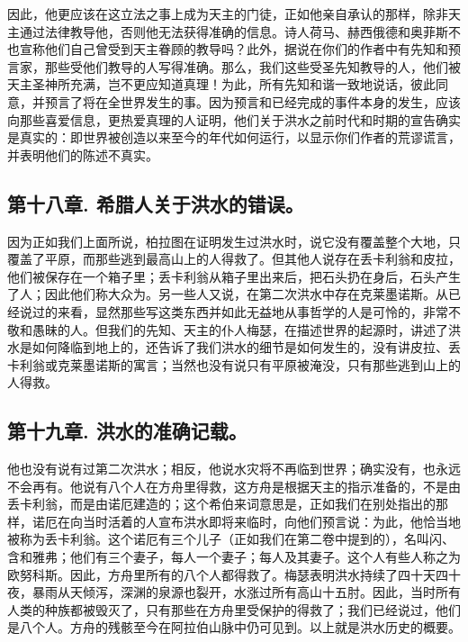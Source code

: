 因此，他更应该在这立法之事上成为天主的门徒，正如他亲自承认的那样，除非天主通过法律教导他，否则他无法获得准确的信息。诗人荷马、赫西俄德和奥菲斯不也宣称他们自己曾受到天主眷顾的教导吗？此外，据说在你们的作者中有先知和预言家，那些受他们教导的人写得准确。那么，我们这些受圣先知教导的人，他们被天主圣神所充满，岂不更应知道真理！为此，所有先知和谐一致地说话，彼此同意，并预言了将在全世界发生的事。因为预言和已经完成的事件本身的发生，应该向那些喜爱信息，更热爱真理的人证明，他们关于洪水之前时代和时期的宣告确实是真实的：即世界被创造以来至今的年代如何运行，以显示你们作者的荒谬谎言，并表明他们的陈述不真实。\par


\subsection{第十八章. 希腊人关于洪水的错误。}

因为正如我们上面所说，柏拉图在证明发生过洪水时，说它没有覆盖整个大地，只覆盖了平原，而那些逃到最高山上的人得救了。但其他人说存在丢卡利翁和皮拉，他们被保存在一个箱子里；丢卡利翁从箱子里出来后，把石头扔在身后，石头产生了人；因此他们称大众为。另一些人又说，在第二次洪水中存在克莱墨诺斯。从已经说过的来看，显然那些写这类东西并如此无益地从事哲学的人是可怜的，非常不敬和愚昧的人。但我们的先知、天主的仆人梅瑟，在描述世界的起源时，讲述了洪水是如何降临到地上的，还告诉了我们洪水的细节是如何发生的，没有讲皮拉、丢卡利翁或克莱墨诺斯的寓言；当然也没有说只有平原被淹没，只有那些逃到山上的人得救。\par


\subsection{第十九章. 洪水的准确记载。}

他也没有说有过第二次洪水；相反，他说水灾将不再临到世界；确实没有，也永远不会再有。他说有八个人在方舟里得救，这方舟是根据天主的指示准备的，不是由丢卡利翁，而是由诺厄建造的；这个希伯来词意思是，正如我们在别处指出的那样，诺厄在向当时活着的人宣布洪水即将来临时，向他们预言说：为此，他恰当地被称为丢卡利翁。这个诺厄有三个儿子（正如我们在第二卷中提到的），名叫闪、含和雅弗；他们有三个妻子，每人一个妻子；每人及其妻子。这个人有些人称之为欧努科斯。因此，方舟里所有的八个人都得救了。梅瑟表明洪水持续了四十天四十夜，暴雨从天倾泻，深渊的泉源也裂开，水涨过所有高山十五肘。因此，当时所有人类的种族都被毁灭了，只有那些在方舟里受保护的得救了；我们已经说过，他们是八个人。方舟的残骸至今在阿拉伯山脉中仍可见到。以上就是洪水历史的概要。\par

